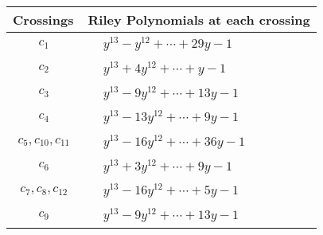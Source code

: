 \documentclass[1p]{elsarticle_modified}
\theoremstyle{definition}
\begin{document}
\begin{tabular}{m{50pt}|m{274pt}}
Crossings & \hspace{64pt}Riley Polynomials at each crossing \\
\hline $$\begin{aligned}c_{1}\end{aligned}$$&$\begin{aligned}
&y^{13}- y^{12}+\cdots+29 y-1
\end{aligned}$\\
\hline $$\begin{aligned}c_{2}\end{aligned}$$&$\begin{aligned}
&y^{13}+4 y^{12}+\cdots+y-1
\end{aligned}$\\
\hline $$\begin{aligned}c_{3}\end{aligned}$$&$\begin{aligned}
&y^{13}-9 y^{12}+\cdots+13 y-1
\end{aligned}$\\
\hline $$\begin{aligned}c_{4}\end{aligned}$$&$\begin{aligned}
&y^{13}-13 y^{12}+\cdots+9 y-1
\end{aligned}$\\
\hline $$\begin{aligned}c_{5},c_{10},c_{11}\end{aligned}$$&$\begin{aligned}
&y^{13}-16 y^{12}+\cdots+36 y-1
\end{aligned}$\\
\hline $$\begin{aligned}c_{6}\end{aligned}$$&$\begin{aligned}
&y^{13}+3 y^{12}+\cdots+9 y-1
\end{aligned}$\\
\hline $$\begin{aligned}c_{7},c_{8},c_{12}\end{aligned}$$&$\begin{aligned}
&y^{13}-16 y^{12}+\cdots+5 y-1
\end{aligned}$\\
\hline $$\begin{aligned}c_{9}\end{aligned}$$&$\begin{aligned}
&y^{13}-9 y^{12}+\cdots+13 y-1
\end{aligned}$\\
\hline
\end{tabular}\\~\\
\end{document}
